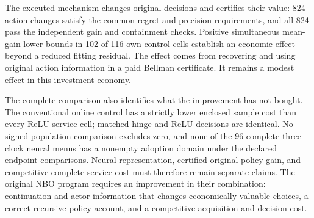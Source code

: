The executed mechanism changes original decisions and certifies their value:
824 action changes satisfy the common regret and precision requirements,
and all 824 pass the independent gain and containment checks. Positive
simultaneous mean-gain lower bounds in 102 of 116 own-control cells establish
an economic effect beyond a reduced fitting residual. The effect comes from
recovering and using original action information in a paid Bellman
certificate. It remains a modest effect in this investment economy.

The complete comparison also identifies what the improvement has not bought.
The conventional online control has a strictly lower enclosed sample cost
than every ReLU service cell; matched hinge and ReLU decisions are identical.
No signed population comparison excludes zero, and none of the 96 complete
three-clock neural menus has a nonempty adoption domain under the declared
endpoint comparisons. Neural representation, certified original-policy gain,
and competitive complete service cost must therefore remain separate claims.
The original NBO program requires an improvement in their combination:
continuation and actor information that changes economically valuable
choices, a correct recursive policy account, and a competitive acquisition
and decision cost.
